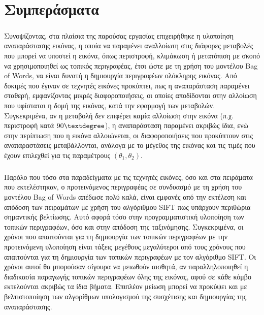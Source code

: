 \chapter{Συμπεράσματα}
\paragraph*{}
Συνοψίζοντας, στα πλαίσια της παρούσας εργασίας επιχειρήθηκε η υλοποίηση αναπαράστασης εικόνας, η οποία να παραμένει αναλλοίωτη στις διάφορες μεταβολές που μπορεί να υποστεί η εικόνα, όπως περιστροφή, κλιμάκωση ή μετατόπιση με σκοπό να χρησιμοποιηθεί ως τοπικός περιγραφέας, έτσι ώστε με τη χρήση του μοντέλου Bag of Words, να είναι δυνατή η δημιουργία περιγραφέων ολόκληρης εικόνας. Από δοκιμές που έγιναν σε τεχνητές εικόνες προκύπτει, πως η αναπαράσταση παραμένει σταθερή, εμφανίζοντας μικρές διαφοροποιήσεις, οι οποίες αποδίδονται στην αλλοίωση που υφίσταται η δομή της εικόνας, κατά την εφαρμογή των μεταβολών. Συγκεκριμένα, αν η μεταβολή δεν επιφέρει καμία αλλοίωση στην εικόνα (π.χ. περιστροφή κατά $90\textdegree$), η αναπαράσταση παραμένει ακριβώς ίδια, ενώ στην περίπτωση που η εικόνα αλλοιώνεται, οι διαφοροποιήσεις που προκύπτουν στις αναπαραστάσεις μεταβάλλονται, ανάλογα με το μέγεθος της εικόνας και τις τιμές που έχουν επιλεχθεί για τις παραμέτρους $(\theta_1, \theta_2)$.

\paragraph*{}
Παρόλο που τόσο στα παραδείγματα με τις τεχνητές εικόνες, όσο και στα πειράματα που εκτελέστηκαν, ο προτεινόμενος περιγραφέας σε συνδυασμό με τη χρήση του μοντέλου Bag of Words απέδωσε πολύ καλά, είναι εμφανές από την εκτέλεση και απόδοση των πειραμάτων με χρήση του αλγόριθμου SIFT πως υπάρχουν περιθώρια σημαντικής βελτίωσης. Αυτό αφορά τόσο στην προγραμματιστική υλοποίηση των τοπικών περιγραφέων, όσο και στην απόδοση της ταξινόμησης. Συγκεκριμένα, οι χρόνοι που απαιτούνται για τη δημιουργία των τοπικών περιγραφέων με την προτεινόμενη υλοποίηση είναι τάξεις μεγέθους μεγαλύτεροι από τους χρόνους που απαιτούνται για τη δημιουργία των τοπικών περιγραφέων με τον αλγόριθμο SIFT. Οι χρόνοι αυτοί θα μπορούσαν σίγουρα να μειωθούν αισθητά, αν παραλληλοποιηθεί η διαδικασία παραγωγής τοπικών περιγραφέων όλης της εικόνας, αφού σε κάθε κόμβο εκτελούνται ακριβώς τα ίδια βήματα. Επιπλέον μείωση μπορεί να προκύψει και με βελτιστοποίηση των αλγορίθμων υπολογισμού της συσχέτισης και δημιουργίας της αναπαράστασης.

